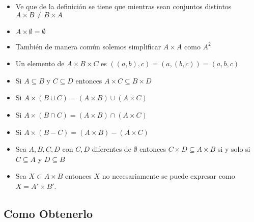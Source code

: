 \documentclass[12pt, fleqn]{report}                             %
\theoremstyle{break}                                            %
\begin{document}
                \begin{itemize}
                    \item Ve que de la definición se tiene que mientras sean conjuntos distintos 
                        $ A \times B \neq B \times A$

                    \item $A \times \emptyset = \emptyset$

                    \item También de manera común solemos simplificar $A \times A$ como $A^2$

                    \item Un elemento de $A \times B \times C$ es $((a,b),c) = (a,(b,c)) = (a,b,c)$

                    \item Si $A \subseteq B$ y $C \subseteq D$ entonces $A \times C \subseteq B \times D$ 

                    \item Si $A \times (B \cup C) = (A \times B) \cup (A \times C)$ 

                    \item Si $A \times (B \cap C) = (A \times B) \cap (A \times C)$ 

                    \item Si $A \times (B - C) = (A \times B) - (A \times C)$

                    \item Sea $A, B, C, D$ con $C, D$ diferentes de $\emptyset$
                        entonces $C \times D \subseteq A \times B$ si y solo si $C \subseteq A$
                        y $D \subseteq B$

                    \item Sea $X \subset A \times B$ entonces $X$ no necesariamente se puede expresar
                    como $X = A' \times B'$.


                \end{itemize}



            \clearpage
            \subsection{Como Obtenerlo}
\end{document}
